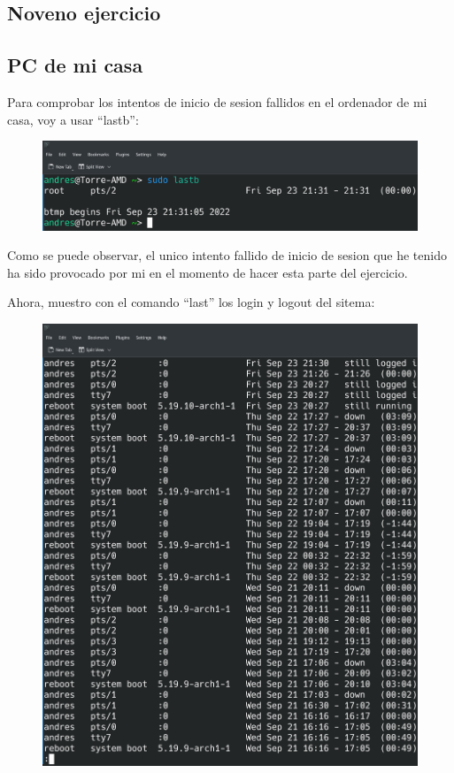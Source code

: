 \documentclass{article}
\begin{document}
\subsection{Noveno ejercicio}
\subsection{PC de mi casa}
Para comprobar los intentos de inicio de sesion fallidos en el ordenador de mi casa, voy a usar ``lastb'':

\begin{figure}[H]
    \includegraphics[width=\textwidth]{imagenes/lastbcasa.png}
\end{figure}

Como se puede observar, el unico intento fallido de inicio de sesion que he tenido ha sido provocado por mi en el momento de hacer esta parte del ejercicio.

Ahora, muestro con el comando ``last'' los login y logout del sitema:

\begin{figure}[H]
    \includegraphics[width=\textwidth]{imagenes/lastcasa.png}
\end{figure}
\end{document}
